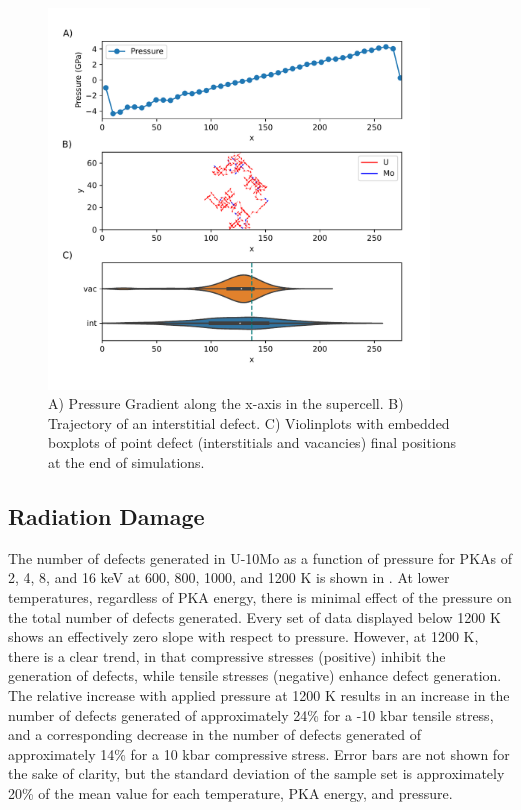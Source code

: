 \documentclass[review]{elsarticle}
\begin{document}
\begin{figure}[h!]
\centering
\includegraphics[width=0.9\textwidth]{PrGrad_2.pdf}
\caption{A) Pressure Gradient along the x-axis in the supercell. B) Trajectory of an interstitial defect. C) Violinplots with embedded boxplots of point defect (interstitials and vacancies) final positions at the end of simulations.}
\label{fig:diff}
\end{figure}

\FloatBarrier

\subsection{Radiation Damage}

The number of defects generated in U-10Mo as a function of pressure for PKAs of 2, 4, 8, and 16 keV at 600, 800, 1000, and 1200 K is shown in . At lower temperatures, regardless of PKA energy, there is minimal effect of the pressure on the total number of defects generated. Every set of data displayed below 1200 K shows an effectively zero slope with respect to pressure. However, at 1200 K, there is a clear trend, in that compressive stresses (positive) inhibit the generation of defects, while tensile stresses (negative) enhance defect generation. The relative increase with applied pressure at 1200 K results in an increase in the number of defects generated of approximately 24\% for a -10 kbar tensile stress, and a corresponding decrease in the number of defects generated of approximately 14\% for a 10 kbar compressive stress. Error bars are not shown for the sake of clarity, but the standard deviation of the sample set is approximately 20\% of the mean value for each temperature, PKA energy, and pressure. 
\end{document}
